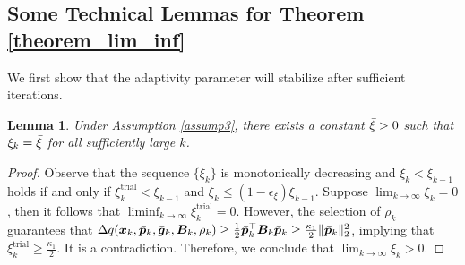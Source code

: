 \documentclass[aos]{imsart}
\numberwithin{equation}{section}
\theoremstyle{plain}
\newtheorem{lemma}{Lemma}
\begin{document}
\begin{appendix}
\subsection{Some Technical Lemmas for Theorem \ref{theorem_lim_inf}}
We first show that the adaptivity parameter will stabilize after sufficient iterations.
\begin{lemma}
\label{lemma18}
    Under Assumption \ref{assump3}, there exists a constant $\Bar{\xi} > 0$ such that $\xi_k = \Bar{\xi}$ for all sufficiently large $k$.
\end{lemma}

\begin{proof}
    Observe that the sequence $\{\xi_k\}$ is monotonically decreasing and $\xi_{k} < \xi_{k-1}$ holds if and only if $\xi_{k}^{\text{trial}} < \xi_{k-1}$ and $\xi_k \leq (1-\epsilon_{\xi}) \xi_{k-1}$. Suppose $\lim_{k \to \infty} \xi_k = 0$, then it follows that $\mathop{\lim \inf}_{k \to \infty} \xi_k^{\text{trial}} = 0$. However, the selection of $\rho_k$ guarantees that $\Delta q(\bm{x}_k,\Bar{\bm{p}}_k,  \Bar{\bm{g}}_{k},\bm{B}_k,\rho_k) \geq \frac{1}{2} \Bar{\bm{p}}_k^{\top} \bm{B}_k \Bar{\bm{p}}_k \geq \frac{\kappa_1}{2} \|\Bar{\bm{p}}_k\|_2^2$, implying that $\xi_k^{\text{trial}} \geq \frac{\kappa_1}{2}$. It is a contradiction. Therefore, we conclude that $\lim_{k \to \infty} \xi_k > 0$. 
\end{proof}


\end{appendix}
\end{document}
